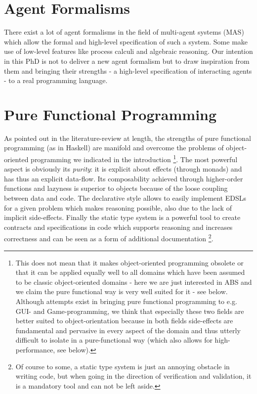 \section{Agent Formalisms}
There exist a lot of agent formalisms in the field of multi-agent systems (MAS) which allow the formal and high-level specification of such a system. Some make use of low-level features like process calculi and algebraic reasoning. Our intention in this PhD is not to deliver a new agent formalism but to draw inspiration from them and bringing their strengths - a high-level specification of interacting agents - to a real programming language. 

\section{Pure Functional Programming}
As pointed out in the literature-review at length, the strengths of pure functional programming (as in Haskell) are manifold and overcome the problems of object-oriented programming we indicated in the introduction \footnote{This does not mean that it makes object-oriented programming obsolete or that it can be applied equally well to all domains which have been assumed to be classic object-oriented domains - here we are just interested in ABS and we claim the pure functional way is very well suited for it - see below. Although attempts exist in bringing pure functional programming to e.g. GUI- and Game-programming, we think that especially these two fields are better suited to object-orientation because in both fields side-effects are fundamental and pervasive in every aspect of the domain and thus utterly difficult to isolate in a pure-functional way (which also allows for high-performance, see below).}. The most powerful aspect is obviously its \textit{purity}: it is explicit about effects (through monads) and has thus an explicit data-flow. Its composability achieved through higher-order functions and lazyness is superior to objects because of the loose coupling between data and code. The declarative style allows to easily implement EDSLs for a given problem which makes reasoning possible, also due to the lack of implicit side-effects. Finally the static type system is a powerful tool to create contracts and specifications in code which supports reasoning and increases correctness and can be seen as a form of additional documentation \footnote{Of course to some, a static type system is just an annoying obstacle in writing code, but when going in the direction of verification and validation, it is a mandatory tool and can not be left aside.}.

